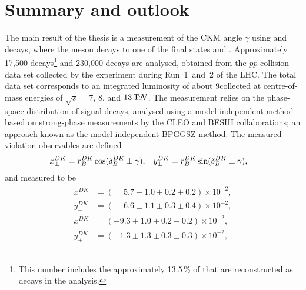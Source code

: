 

\chapter{Summary and outlook}
\label{ch:6-conclusion}

The main result of the thesis is a measurement of the CKM angle $\gamma$ using \BtoDK and \BtoDpi decays, where the \D meson decays to one of the final states \Kspipi and \KsKK. Approximately 17,500 \BtoDK decays\footnote{This number includes the approximately 13.5\,\% of \BtoDK that are reconstructed as \BtoDpi decays in the analysis.} and 230,000 \BtoDpi decays are analysed, obtained from the $pp$ collision data set collected by the \lhcb experiment during Run~1~and~2 of the LHC. The total data set corresponds to an integrated luminosity of about 9\invfb collected at centre-of-mass energies of $\sqrt s =7$, $8$, and $13\text{\,Te\kern -0.1em V}$. The measurement relies on the phase-space distribution of signal decays, analysed using a model-independent method based on strong-phase measurements by the CLEO and BESIII collaborations; an approach known as the model-independent BPGGSZ method. The measured \CP-violation observables are defined
\begin{align}
    x_\pm^{{D}{K}} &= r_B^{DK} \cos (\delta_B^{DK} \pm \gamma), & y_\pm^{{D}{K}} &= r_B^{DK} \sin (\delta_B^{DK} \pm \gamma),
\end{align}
and measured to be
\begin{align}
\begin{split}
    x_-^{DK} & = (\phantom{-}5.7 \pm 1.0 \pm  0.2\pm 0.2) \times 10^{-2}, \\
    y_-^{DK} & = (\phantom{-}6.6 \pm 1.1 \pm  0.3\pm 0.4) \times 10^{-2}, \\
    x_+^{DK} & = (         - 9.3 \pm 1.0 \pm  0.2\pm 0.2) \times 10^{-2}, \\
    y_+^{DK} & = (         - 1.3 \pm 1.3 \pm  0.3\pm 0.3) \times 10^{-2},
\end{split}
\end{align}
